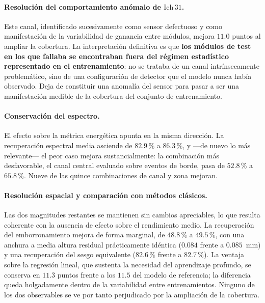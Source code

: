 \paragraph{Resolución del comportamiento anómalo de \texorpdfstring{$\mathrm{Ich}\,31$}{Ich 31}.}
Este canal, identificado sucesivamente como sensor defectuoso y como manifestación de la
variabilidad de ganancia entre módulos, mejora $11.0$ puntos al ampliar la cobertura. La
interpretación definitiva es que \textbf{los módulos de test en los que fallaba se encontraban fuera
del régimen estadístico representado en el entrenamiento}: no se trataba de un canal
intrínsecamente problemático, sino de una configuración de detector que el modelo nunca había
observado. Deja de constituir una anomalía del sensor para pasar a ser una manifestación medible de
la cobertura del conjunto de entrenamiento.

\paragraph{Conservación del espectro.} El efecto sobre la métrica energética apunta en la misma
dirección. La recuperación espectral media asciende de $82.9\,\%$ a $86.3\,\%$, y ---de nuevo lo más
relevante--- el peor caso mejora sustancialmente: la combinación más desfavorable, el canal central
evaluado sobre eventos de borde, pasa de $52.8\,\%$ a $65.8\,\%$. Nueve de las quince combinaciones
de canal y zona mejoran.

\paragraph{Resolución espacial y comparación con métodos clásicos.} Las dos magnitudes restantes se
mantienen sin cambios apreciables, lo que resulta coherente con la ausencia de efecto sobre el
rendimiento medio. La recuperación del emborronamiento mejora de forma marginal, de $48.8\,\%$ a
$49.5\,\%$, con una anchura a media altura residual prácticamente idéntica ($0.084$ frente a
$0.085$~mm) y una recuperación del sesgo equivalente ($82.6\,\%$ frente a $82.7\,\%$). La ventaja
sobre la regresión lineal, que sustenta la necesidad del aprendizaje profundo, se conserva en
$11.3$ puntos frente a los $11.5$ del modelo de referencia; la diferencia queda holgadamente dentro
de la variabilidad entre entrenamientos. Ninguno de los dos observables se ve por tanto perjudicado
por la ampliación de la cobertura.

